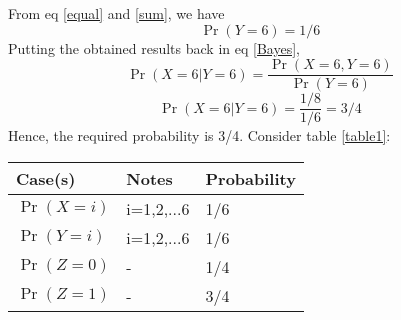 \documentclass[journal,12pt,twocolumn]{IEEEtran}
\begin{document}
From eq \ref{equal} and \ref{sum}, we have 
$$ \Pr(Y=6) = 1/6 $$
Putting the obtained results back in eq \ref{Bayes},
$$\Pr(X=6|Y=6) = \frac{\Pr(X=6, Y=6)}{\Pr(Y=6)} $$
$$\Pr(X=6|Y=6) = \frac{1/8}{1/6} = 3/4$$
Hence, the required probability is 3/4.
\newline \newline Consider table \ref{table1}:
\begin{center}
\label{table1}
\begin{tabular}{ |m{1.75cm}| m{1.75cm}| m{2cm} | } 
\hline
Case(s) & Notes & Probability\\ 
\hline
$\Pr(X=i)$ & i=1,2,...6 & 1/6 \\ 
\hline
$\Pr(Y=i)$ & i=1,2,...6 & 1/6 \\ 
\hline
$\Pr(Z=0)$ & - & 1/4 \\ 
\hline 
$\Pr(Z=1)$ & - & 3/4 \\ 
\hline
\end{tabular}
\end{center}
\end{document}
